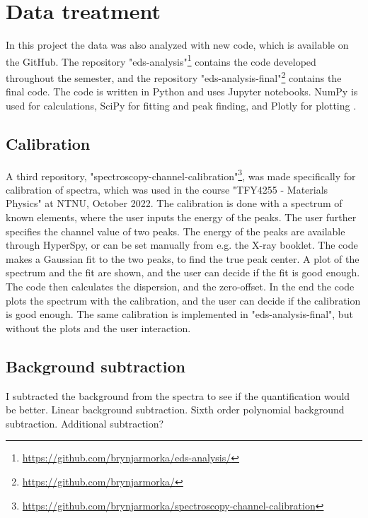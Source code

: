 %
%
\section{Data treatment}
\label{sec:method:treatment}
In this project the data was also analyzed with new code, which is available on the GitHub.
The repository "eds-analysis"\footnote{\url{https://github.com/brynjarmorka/eds-analysis/}} contains the code developed throughout the semester, and the repository "eds-analysis-final"\footnote{\url{https://github.com/brynjarmorka/}} contains the final code.
The code is written in Python and uses Jupyter notebooks.
NumPy is used for calculations, SciPy for fitting and peak finding, and Plotly for plotting .


\subsection{Calibration}
\label{sec:method:treatment:calibration}
A third repository, "spectroscopy-channel-calibration"\footnote{\url{https://github.com/brynjarmorka/spectroscopy-channel-calibration}}, was made specifically for calibration of spectra, which was used in the course "TFY4255 - Materials Physics" at NTNU, October 2022.
The calibration is done with a spectrum of known elements, where the user inputs the energy of the peaks.
The user further specifies the channel value of two peaks.
The energy of the peaks are available through HyperSpy, or can be set manually from e.g. the X-ray booklet.
The code makes a Gaussian fit to the two peaks, to find the true peak center.
A plot of the spectrum and the fit are shown, and the user can decide if the fit is good enough.
The code then calculates the dispersion, and the zero-offset.
In the end the code plots the spectrum with the calibration, and the user can decide if the calibration is good enough.
The same calibration is implemented in "eds-analysis-final", but without the plots and the user interaction.



\subsection{Background subtraction}
\label{sec:method:treatment:background}
I subtracted the background from the spectra to see if the quantification would be better.
Linear background subtraction.
Sixth order polynomial background subtraction.
Additional subtraction?

